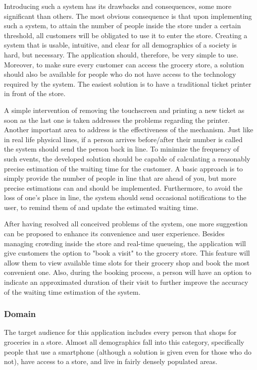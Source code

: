 Introducing such a system has its drawbacks and consequences, some more significant than others. The most obvious consequence is that upon implementing such a system, to attain the number of people inside the store under a certain threshold, all customers will be obligated to use it to enter the store. Creating a system that is usable, intuitive, and clear for all demographics of a society is hard, but necessary. The application should, therefore, be very simple to use. Moreover, to make sure every customer can access the grocery store, a solution should also be available for people who do not have access to the technology required by the system. The easiest solution is to have a traditional ticket printer in front of the store. 

A simple intervention of removing the touchscreen and printing a new ticket as soon as the last one is taken addresses the problems regarding the printer. Another important area to address is the effectiveness of the mechanism. Just like in real life physical lines, if a person arrives before/after their number is called the system should send the person back in line. To minimize the frequency of such events, the developed solution should be capable of calculating a reasonably precise estimation of the waiting time for the customer. A basic approach is to simply provide the number of people in line that are ahead of you, but more precise estimations can and should be implemented. Furthermore, to avoid the loss of one’s place in line, the system should send occasional notifications to the user, to remind them of and update the estimated waiting time. 

After having resolved all conceived problems of the system, one more suggestion can be proposed to enhance its convenience and user experience. Besides managing crowding inside the store and real-time queueing, the application will give customers the option to "book a visit" to the grocery store. This feature will allow them to view available time slots for their grocery shop and book the most convenient one. Also, during the booking process, a person will have an option to indicate an approximated duration of their visit to further improve the accuracy of the waiting time estimation of the system. 
\subsubsection{Domain}
\hspace{\parindent}The target audience for this application includes every person that shops for groceries in a store. Almost all demographics fall into this category, specifically people that use a smartphone (although a solution is given even for those who do not), have access to a store, and live in fairly densely populated areas.
  
